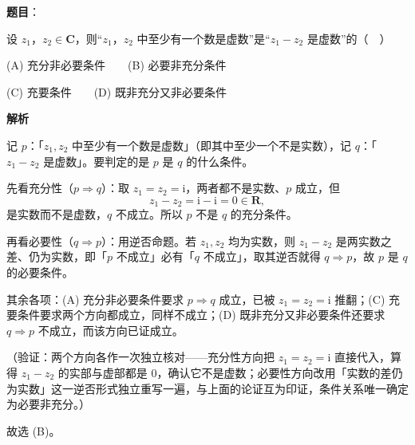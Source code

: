 \begin{answer}

\end{answer}
\begin{answer}

\textbf{题目}：

设 \(z_{1}\)，\(z_{2}\in\mathbf{C}\)，则“\(z_{1}\)，\(z_{2}\) 中至少有一个数是虚数”是“\(z_{1}-z_{2}\) 是虚数”的（　）

(A) 充分非必要条件　　(B) 必要非充分条件

(C) 充要条件　　(D) 既非充分又非必要条件

\textbf{解析}

记 \(p\)：「\(z_{1},z_{2}\) 中至少有一个数是虚数」（即其中至少一个不是实数），记 \(q\)：「\(z_{1}-z_{2}\) 是虚数」。要判定的是 \(p\) 是 \(q\) 的什么条件。

先看充分性（\(p\Rightarrow q\)）：取 \(z_{1}=z_{2}=\mathrm{i}\)，两者都不是实数、\(p\) 成立，但
\nopagebreak[4]
\[
z_{1}-z_{2}=\mathrm{i}-\mathrm{i}=0\in\mathbf{R},
\]
是实数而不是虚数，\(q\) 不成立。所以 \(p\) 不是 \(q\) 的充分条件。

再看必要性（\(q\Rightarrow p\)）：用逆否命题。若 \(z_{1},z_{2}\) 均为实数，则 \(z_{1}-z_{2}\) 是两实数之差、仍为实数，即「\(p\) 不成立」必有「\(q\) 不成立」，取其逆否就得 \(q\Rightarrow p\)，故 \(p\) 是 \(q\) 的必要条件。

其余各项：(A) 充分非必要条件要求 \(p\Rightarrow q\) 成立，已被 \(z_{1}=z_{2}=\mathrm{i}\) 推翻；(C) 充要条件要求两个方向都成立，同样不成立；(D) 既非充分又非必要条件还要求 \(q\Rightarrow p\) 不成立，而该方向已证成立。

（验证：两个方向各作一次独立核对——充分性方向把 \(z_{1}=z_{2}=\mathrm{i}\) 直接代入，算得 \(z_{1}-z_{2}\) 的实部与虚部都是 \(0\)，确认它不是虚数；必要性方向改用「实数的差仍为实数」这一逆否形式独立重写一遍，与上面的论证互为印证，条件关系唯一确定为必要非充分。）

故选 (B)。


\end{answer}
